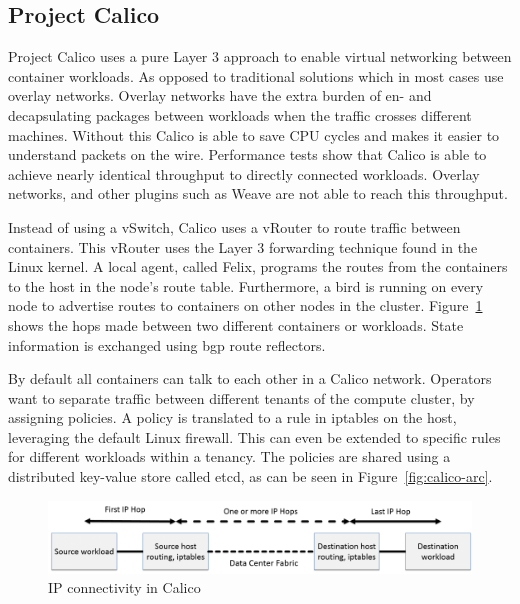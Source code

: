 \subsection{Project Calico}
\label{subsec:calico}
Project Calico uses a pure Layer 3 approach to enable virtual networking between container workloads. As opposed to traditional solutions which in most cases use overlay networks. Overlay networks have the extra burden of en- and decapsulating packages between workloads when the traffic crosses different machines. Without this Calico is able to save CPU cycles and makes it easier to understand packets on the wire. Performance tests\cite{dzone, dataplane, chunqi} show that Calico is able to achieve nearly identical throughput to directly connected workloads. Overlay networks, and other plugins such as Weave\cite{weave} are not able to reach this throughput.

Instead of using a vSwitch, Calico uses a vRouter to route traffic between containers. This vRouter uses the Layer 3 forwarding technique found in the Linux kernel. A local agent, called Felix, programs the routes from the containers to the host in the node's route table. Furthermore, a \gls{bird} is running on every node to advertise routes to containers on other nodes in the cluster. Figure~\ref{fig:hops} shows the hops made between two different containers or workloads. State information is exchanged using \gls{bgp} route reflectors.

By default all containers can talk to each other in a Calico network. Operators want to separate traffic between different tenants of the compute cluster, by assigning policies. A policy is translated to a rule in iptables\cite{iptables} on the host, leveraging the default Linux firewall. This can even be extended to specific rules for different workloads within a tenancy. The policies are shared using a distributed key-value store called etcd\cite{etcd}, as can be seen in Figure~\ref{fig:calico-arc}.

\begin{figure}
    \centering
    \includegraphics[scale=0.35]{images/calico-hops}
    \caption{IP connectivity in Calico\cite{calico_learn}}
    \label{fig:hops}
\end{figure}

